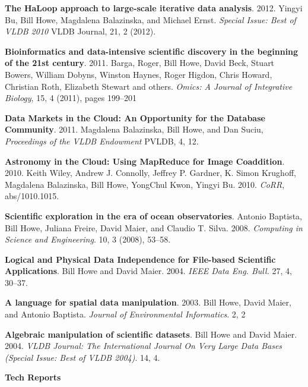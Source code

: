 \begin{bulletlist}
\item \textbf{The HaLoop approach to large-scale iterative data analysis}. 2012.
Yingyi Bu, Bill Howe, Magdalena Balazinska, and Michael
Ernst.
\emph{Special Issue: Best of VLDB 2010} VLDB Journal, 21, 2 (2012).

\item \textbf{Bioinformatics and data-intensive scientific discovery in the beginning of the 21st century}. 2011.
Barga, Roger, Bill Howe, David Beck, Stuart Bowers, William Dobyns, Winston Haynes, 
Roger Higdon, Chris Howard, Christian Roth, Elizabeth Stewart and others.
\emph{Omics: A Journal of Integrative Biology}, 15, 4 (2011), pages 199--201

\item \textbf{Data Markets in the Cloud: An Opportunity for the Database Community}. 2011.
Magdalena Balazinska, Bill Howe, and Dan Suciu,
\emph{Proceedings of the VLDB Endowment} PVLDB, 4, 12. 

\item \textbf{Astronomy in the Cloud: Using MapReduce for Image Coaddition}. 2010.
Keith Wiley, Andrew J. Connolly, Jeffrey P. Gardner,
               K. Simon Krughoff, Magdalena Balazinska,
               Bill Howe, YongChul Kwon, Yingyi Bu. 2010.
\emph{CoRR}, abs/1010.1015.

\item \textbf{Scientific exploration in the era of ocean observatories}.
Antonio Baptista, Bill Howe, Juliana Freire, David Maier, 
and Claudio T. Silva. 2008.
\emph{Computing in Science and Engineering}. 10, 3 (2008), 53--58.

\item \textbf{Logical and Physical Data Independence for File-based Scientific Applications}. 
Bill Howe and David Maier. 2004. 
\emph{IEEE Data Eng. Bull.} 27, 4, 30--37. 

\item \textbf{A language for spatial data manipulation}. 2003.
Bill Howe, David Maier, and Antonio Baptista. 
\emph{Journal of Environmental Informatics}. 2, 2 

\item \textbf{Algebraic manipulation of scientific datasets}. 
Bill Howe and David Maier. 2004. 
\emph{VLDB Journal:
The International Journal On Very Large Data Bases (Special Issue: Best of VLDB 2004)}. 14, 4.

\end{bulletlist}

{\bf Tech Reports}

